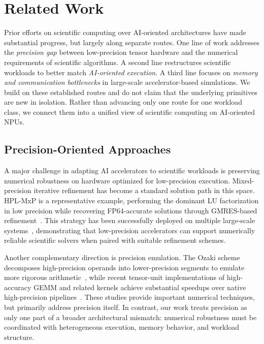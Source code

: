 \documentclass{article}
\newcommand{\rev}[1]{#1}
\begin{document}
\section{Related Work}

Prior efforts on scientific computing over AI-oriented architectures have made substantial progress, but largely along separate routes. One line of work addresses the \emph{precision gap} between low-precision tensor hardware and the numerical requirements of scientific algorithms. A second line restructures scientific workloads to better match \emph{AI-oriented execution}. A third line focuses on \emph{memory and communication bottlenecks} in large-scale accelerator-based simulations. \rev{We build on these established routes and do not claim that the underlying primitives are new in isolation.} Rather than advancing only one route for one workload class, we connect them into a unified view of scientific computing on AI-oriented NPUs.

\subsection{Precision-Oriented Approaches}

A major challenge in adapting AI accelerators to scientific workloads is preserving numerical robustness on hardware optimized for low-precision execution. Mixed-precision iterative refinement has become a standard solution path in this space. HPL-MxP is a representative example, performing the dominant LU factorization in low precision while recovering FP64-accurate solutions through GMRES-based refinement~\cite{10.1177/10943420251382476, dongarra2024hardware}. This strategy has been successfully deployed on multiple large-scale systems~\cite{kudo2020implementation, lu2022climbing, xue_unlocking}, demonstrating that low-precision accelerators can support numerically reliable scientific solvers when paired with suitable refinement schemes.

Another complementary direction is precision emulation. The Ozaki scheme decomposes high-precision operands into lower-precision segments to emulate more rigorous arithmetic~\cite{ozaki2012error}, while recent tensor-unit implementations of high-accuracy GEMM and related kernels achieve substantial speedups over native high-precision pipelines~\cite{feng2021egemm, ma2022efficiently, xue2025sgemm, 10.1145/3773656.3773670}. These studies provide important numerical techniques, but primarily address precision itself. In contrast, our work treats precision as only one part of a broader architectural mismatch: numerical robustness must be \rev{coordinated} with heterogeneous execution, memory behavior, and workload structure.
\end{document}

